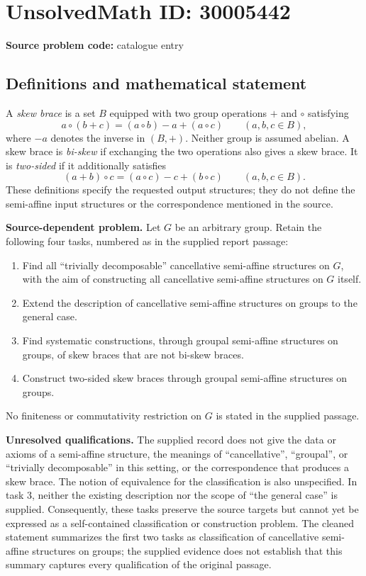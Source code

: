 \documentclass[11pt]{article}
\begin{document}
\section*{UnsolvedMath ID: 30005442}
\textbf{Source problem code:} catalogue entry
\subsection{Definitions and mathematical statement}
A \emph{skew brace} is a set \(B\) equipped with two group operations \(+\) and \(\circ\) satisfying
\[
a\circ(b+c)=(a\circ b)-a+(a\circ c)\qquad(a,b,c\in B),
\]
where \(-a\) denotes the inverse in \((B,+)\). Neither group is assumed abelian. A skew brace is \emph{bi-skew} if exchanging the two operations also gives a skew brace. It is \emph{two-sided} if it additionally satisfies
\[
(a+b)\circ c=(a\circ c)-c+(b\circ c)\qquad(a,b,c\in B).
\]
These definitions specify the requested output structures; they do not define the semi-affine input structures or the correspondence mentioned in the source.

\textbf{Source-dependent problem.} Let \(G\) be an arbitrary group. Retain the following four tasks, numbered as in the supplied report passage:
\begin{enumerate}
\item[2.] Find all ``trivially decomposable'' cancellative semi-affine structures on \(G\), with the aim of constructing all cancellative semi-affine structures on \(G\) itself.
\item[3.] Extend the description of cancellative semi-affine structures on groups to the general case.
\item[4.] Find systematic constructions, through groupal semi-affine structures on groups, of skew braces that are not bi-skew braces.
\item[5.] Construct two-sided skew braces through groupal semi-affine structures on groups.
\end{enumerate}
No finiteness or commutativity restriction on \(G\) is stated in the supplied passage.

\textbf{Unresolved qualifications.} The supplied record does not give the data or axioms of a semi-affine structure, the meanings of ``cancellative'', ``groupal'', or ``trivially decomposable'' in this setting, or the correspondence that produces a skew brace. The notion of equivalence for the classification is also unspecified. In task 3, neither the existing description nor the scope of ``the general case'' is supplied. Consequently, these tasks preserve the source targets but cannot yet be expressed as a self-contained classification or construction problem. The cleaned statement summarizes the first two tasks as classification of cancellative semi-affine structures on groups; the supplied evidence does not establish that this summary captures every qualification of the original passage.
\end{document}
